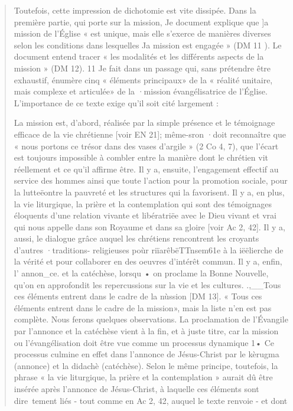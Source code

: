 \begin{quote}
Toutefois, cette impression de dichotomie est vite dissipée.
Dans la première partie, qui porte sur la mission, Je document
explique que ]a mission de l'Église « est unique, mais elle
s'exerce de manières diverses selon les conditions dans lesquelles
Ja mission est engagée » (DM 11 ). Le document entend
tracer « les modalités et les différents aspects de la mission »
(DM 12). 11 Je fait dans un passage qui, sans prétendre être
exhaustif, énumère cinq « éléments principaux» de la « réalité
unitaire, mais complexe et articulée» de la ·mission évangélisatrice
de l'Église. L'importance de ce texte exige qu'il soit
cité largement :
\begin{quote}
    
\end{quote}
La mission est, d'abord, réalisée par la simple présence et le
témoignage efficace de la vie chrétienne [voir EN 21]; même-sron
·doit reconnaître que « nous portons ce trésor dans des vases d'argile
» (2 Co 4, 7), que l'écart est toujours impossible à combler entre
la manière dont le chrétien vit réellement et ce qu'il affirme être.
Il y a, ensuite, l'engagement effectif au service des hommes ainsi
que toute l'action pour la promotion sociale, pour la lutteëontre la
pauvreté et les structures qui la favorisent.
Il y a, en plus, la vie liturgique, la prière et la contemplation qui
sont des témoignages éloquents d'une relation vivante et libératriëe
avec le Dieu vivant et vrai qui nous appelle dans son Royaume et
dans sa gloire [voir Ac 2, 42].
Il y a, aussi, le dialogue grâce auquel les chrétiens rencontrent les
croyants d'autres ·traditions- religieuses poùr riïarêbëTTnsem61e à la
iëëlierche de la vérité et pour collaborer en des oeuvres d'intérêt
commun.
Il y a, enfin, l' annon_ce. et la catéchèse, lorsqu • on proclame la
Bonne Nouvelle, qu'on en approfondit les repercussions sur la vie et
les cultures.
.,__Tous ces éléments entrent dans le cadre de la nùssion [DM 13].
« Tous ces éléments entrent dans le cadre de la mission»,
mais la liste n'en est pas complète. Nous ferons quelques
observations. La proclamation de l'Évangile par l'annonce et
la catéchèse vient à la fin, et à juste titre, car la mission ou
l'évangélisation doit être vue comme un processus dynamique 1•
Ce processus culmine en effet dans l'annonce de Jésus-Christ
par le kèrugma (annonce) et la didachè (catéchèse). Selon le
même principe, toutefois, la phrase « la vie liturgique, la prière
et la contemplation » aurait dû être insérée après l'annonce de
Jésus-Christ, à laquelle ces éléments sont dire~tement liés
- tout comme en Ac 2, 42, auquel le texte renvoie - et dont

\end{quote}
